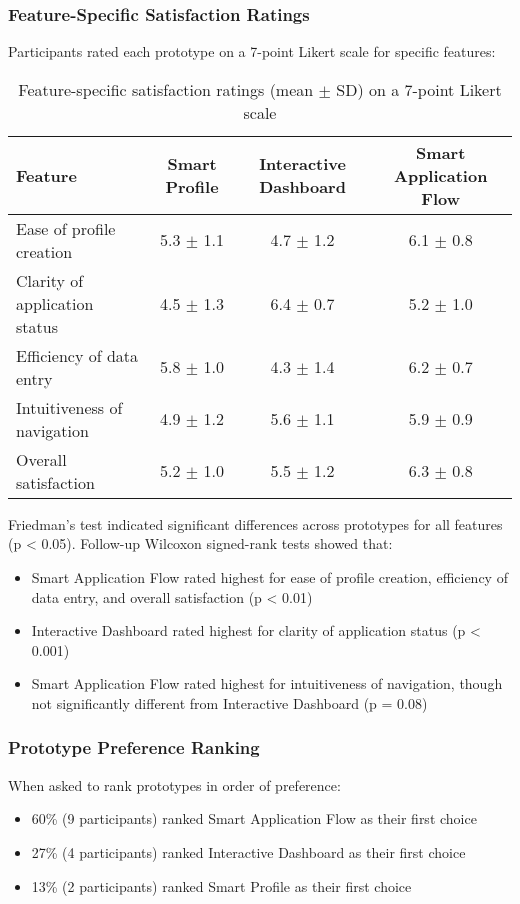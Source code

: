 \documentclass[
	letterpaper, %
]{jdf}
\begin{document}
\begin{sloppypar}
\subsubsection{Feature-Specific Satisfaction Ratings}

Participants rated each prototype on a 7-point Likert scale for specific features:

\begin{table}[h]
\centering
\begin{tabular}{|l|c|c|c|}
\hline
\textbf{Feature} & \textbf{Smart Profile} & \textbf{Interactive Dashboard} & \textbf{Smart Application Flow} \\
\hline
Ease of profile creation & 5.3 $\pm$ 1.1 & 4.7 $\pm$ 1.2 & 6.1 $\pm$ 0.8 \\
Clarity of application status & 4.5 $\pm$ 1.3 & 6.4 $\pm$ 0.7 & 5.2 $\pm$ 1.0 \\
Efficiency of data entry & 5.8 $\pm$ 1.0 & 4.3 $\pm$ 1.4 & 6.2 $\pm$ 0.7 \\
Intuitiveness of navigation & 4.9 $\pm$ 1.2 & 5.6 $\pm$ 1.1 & 5.9 $\pm$ 0.9 \\
Overall satisfaction & 5.2 $\pm$ 1.0 & 5.5 $\pm$ 1.2 & 6.3 $\pm$ 0.8 \\
\hline
\end{tabular}
\caption{Feature-specific satisfaction ratings (mean $\pm$ SD) on a 7-point Likert scale}
\end{table}

Friedman's test indicated significant differences across prototypes for all features (p < 0.05). Follow-up Wilcoxon signed-rank tests showed that:
\begin{itemize}
    \item Smart Application Flow rated highest for ease of profile creation, efficiency of data entry, and overall satisfaction (p < 0.01)
    \item Interactive Dashboard rated highest for clarity of application status (p < 0.001)
    \item Smart Application Flow rated highest for intuitiveness of navigation, though not significantly different from Interactive Dashboard (p = 0.08)
\end{itemize}

\subsubsection{Prototype Preference Ranking}

When asked to rank prototypes in order of preference:
\begin{itemize}
    \item 60\% (9 participants) ranked Smart Application Flow as their first choice
    \item 27\% (4 participants) ranked Interactive Dashboard as their first choice
    \item 13\% (2 participants) ranked Smart Profile as their first choice
\end{itemize}


\end{sloppypar}
\end{document}
